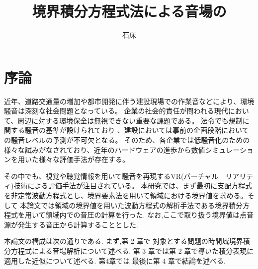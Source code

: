 \documentclass[dvipdfmx]{ampbt}
\title{境界積分方程式法による音場の}     %
      {数値解析と移動する受音点における}      %
      {リアルタイム可聴化について}                %
\author{石床}{竜一}             %
\begin{document}
\ifoutputbody
\makeinsidecover                %
\makeabstract                   %
\maketoc                        %
\setcounter{page}{1}            %
\section{序論}
近年、道路交通量の増加や都市開発に伴う建設現場での作業音などにより、環境騒音は深刻な社会問題となっている。
企業の社会的責任が問われる現代において、周辺に対する環境保全は無視できない重要な課題である。
法令でも規制に関する騒音の基準が設けられており
、建設においては事前の企画段階においての騒音レベルの予測が不可欠となる。
そのため、各企業では低騒音化のための様々な試みがなされており、近年のハードウェアの進歩から数値シミュレーションを用いた様々な評価手法が存在する。

その中でも、視覚や聴覚情報を用いて騒音を再現するVR(バーチャル　リアリティ)技術による評価手法が注目されている。
本研究では、まず最初に支配方程式を非定常波動方程式とし、境界要素法を用いて領域における境界値を求める。そして
本論文では領域の境界値を用いた波動方程式の解析手法である境界積分方程式を用いて領域内での音圧の計算を行った.
なお,ここで取り扱う境界値は点音源が発生する音圧から計算することとした.\par

本論文の構成は次の通りである.
 まず,第 2 章で 対象とする問題の時間域境界積分方程式による音場解析について述べる.
 第 3 章では第 2 章で導いた積分表現に適用した近似について述べる.
第4章では
 最後に第 4 章で結論を述べる.
\end{document}
